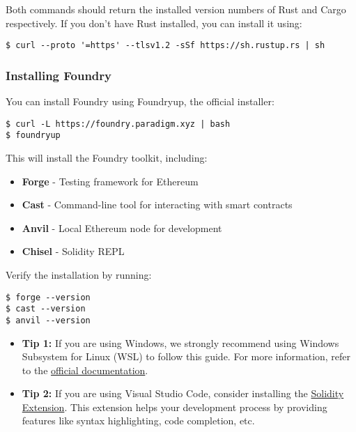 \documentclass[12pt]{article}
\begin{document}
\noindent
Both commands should return the installed version numbers of Rust and Cargo respectively. If you don't have Rust installed, you can install it using:

\begin{verbatim}
$ curl --proto '=https' --tlsv1.2 -sSf https://sh.rustup.rs | sh
\end{verbatim}

\subsubsection*{Installing Foundry}
You can install Foundry using Foundryup, the official installer:

\begin{verbatim}
$ curl -L https://foundry.paradigm.xyz | bash
$ foundryup
\end{verbatim}

\noindent
This will install the Foundry toolkit, including:
\begin{itemize}
    \item \textbf{Forge} - Testing framework for Ethereum
    \item \textbf{Cast} - Command-line tool for interacting with smart contracts
    \item \textbf{Anvil} - Local Ethereum node for development
    \item \textbf{Chisel} - Solidity REPL
\end{itemize}

Verify the installation by running:

\begin{verbatim}
$ forge --version
$ cast --version
$ anvil --version
\end{verbatim}

\begin{itemize}
    \item \textbf{Tip 1:} If you are using Windows, we strongly recommend using Windows Subsystem for Linux (WSL) to follow this guide. For more information, refer to the \href{https://learn.microsoft.com/en-us/windows/wsl/about}{official documentation}.
    
    \item \textbf{Tip 2:} If you are using Visual Studio Code, consider installing the \href{https://marketplace.visualstudio.com/items?itemName=NomicFoundation.hardhat-solidity}{Solidity Extension}. This extension helps your development process by providing features like syntax highlighting, code completion, etc.
\end{itemize}
\end{document}
